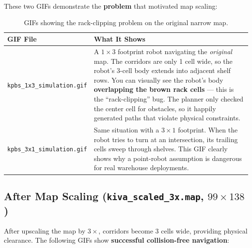 \documentclass[12pt, a4paper]{article}
\begin{document}
These two GIFs demonstrate the \textbf{problem} that motivated map scaling:

\begin{table}[H]
\centering
\begin{tabular}{@{}lp{10cm}@{}}
\toprule
\textbf{GIF File} & \textbf{What It Shows} \\
\midrule
\texttt{kpbs\_1x3\_simulation.gif} &
A $1\times3$ footprint robot navigating the \emph{original} map. The corridors are only 1 cell wide, so the robot's 3-cell body extends into adjacent shelf rows. You can visually see the robot's body \textbf{overlapping the brown rack cells} --- this is the ``rack-clipping'' bug. The planner only checked the center cell for obstacles, so it happily generated paths that violate physical constraints. \\
\addlinespace
\texttt{kpbs\_3x1\_simulation.gif} &
Same situation with a $3\times1$ footprint. When the robot tries to turn at an intersection, its trailing cells sweep through shelves. This GIF clearly shows why a point-robot assumption is dangerous for real warehouse deployments. \\
\bottomrule
\end{tabular}
\caption{GIFs showing the rack-clipping problem on the original narrow map.}
\label{tab:before}
\end{table}

\subsection{After Map Scaling (\texttt{kiva\_scaled\_3x.map}, $99\times138$)}

After upscaling the map by $3\times$, corridors become 3 cells wide, providing physical clearance. The following GIFs show \textbf{successful collision-free navigation}:
\end{document}
